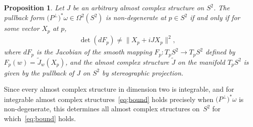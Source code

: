 \documentclass[10pt,a4paper]{amsart}
\newtheorem{prop}[thm]{Proposition}
{ \theoremstyle{definition} \newtheorem{defn}[thm]{Definition}
 \newtheorem{ex}[thm]{Example}
 \newtheorem{rmk}[thm]{Remark}}
\numberwithin{equation}{section}
\newcommand{\Om}{\Omega}
\begin{document}
\begin{prop} \label{prop;S2calc} Let $J$ be an arbitrary almost complex structure on $S^2$. The pullback form $\big(P^\perp\big)^*\omega \in \Om^2(S^2)$ is non-degenerate at $p \in S^2$ if and only if for some vector $X_p$ at $p$,
\begin{gather*}
\det(dF_p) \neq \|X_p + i JX_p\|^2,
\end{gather*}
where $dF_p$ is the Jacobian of the smooth mapping $F_p: T_pS^2 \to T_p S^2$ defined by $F_p(w) = \tilde J_w(X_p)$, and the almost complex structure $\tilde J$ on the manifold $T_pS^2$ is given by the pullback of $J$ on $S^2$ by stereographic projection.
\end{prop}

Since every almost complex structure in dimension two is integrable, and for integrable almost complex structures~\eqref{eq;bound} holds precisely when $\big(P^\perp\big)^*\omega$ is non-degenerate, this determines all almost complex structures on~$S^2$ for which~\eqref{eq;bound} holds.
\end{document}

